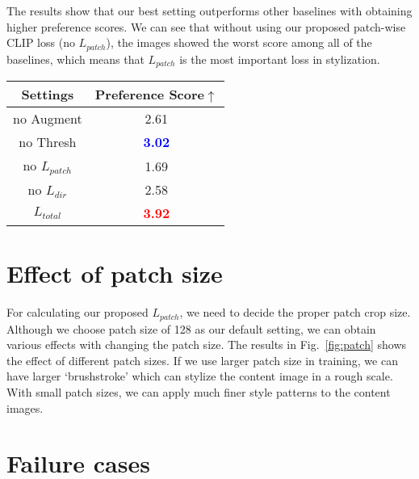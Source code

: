 \documentclass[10pt,twocolumn,letterpaper]{article}
\begin{document}
The results show that our best setting outperforms other baselines with obtaining higher preference scores. We can see that without using our proposed patch-wise CLIP loss (no $L_{patch}$), the images showed the worst score among all of the baselines, which means that $L_{patch}$ is the most important loss in stylization. 

\begin{table}[!t]
		\centering
		\begin{adjustbox}{width=0.3\textwidth}
		\begin{tabular}[b]{c|c}
      \textbf{Settings} & \textbf{Preference Score$\uparrow$} \\ \hline
      
      no Augment &2.61\\
      no Thresh & \textcolor{blue}{\textbf{3.02}} \\
      no $L_{patch}$ & 1.69 \\
      no $L_{dir}$ & 2.58\\
      \hdashline
      $L_{total}$ & \textcolor{red}{\textbf{3.92}} \\
      
    \hline
    \end{tabular}
    \end{adjustbox}
	
	\label{tab:abl}

\end{table}

\section{Effect of patch size}



For calculating our proposed $L_{patch}$, we need to decide the proper patch crop size. Although we choose patch size of 128 as our default setting, we can obtain various effects with changing the patch size. The results in Fig.~\ref{fig:patch} shows the effect of different patch sizes. If we use larger patch size in training, we can have larger `brushstroke' which can stylize the content image in a rough scale.  With small patch sizes, we can apply much finer style patterns to the content images. 



\section{Failure cases}
\end{document}
